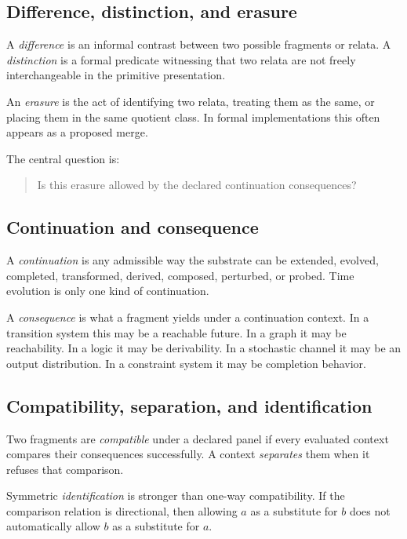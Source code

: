 \documentclass[11pt]{article}
\begin{document}
\subsection{Difference, distinction, and erasure}

A \emph{difference} is an informal contrast between two possible fragments or
relata. A \emph{distinction} is a formal predicate witnessing that two relata
are not freely interchangeable in the primitive presentation.

An \emph{erasure} is the act of identifying two relata, treating them as the
same, or placing them in the same quotient class. In formal implementations
this often appears as a proposed merge.

The central question is:

\begin{quote}
Is this erasure allowed by the declared continuation consequences?
\end{quote}

\subsection{Continuation and consequence}

A \emph{continuation} is any admissible way the substrate can be extended,
evolved, completed, transformed, derived, composed, perturbed, or probed. Time
evolution is only one kind of continuation.

A \emph{consequence} is what a fragment yields under a continuation context. In
a transition system this may be a reachable future. In a graph it may be
reachability. In a logic it may be derivability. In a stochastic channel it may
be an output distribution. In a constraint system it may be completion
behavior.

\subsection{Compatibility, separation, and identification}

Two fragments are \emph{compatible} under a declared panel if every evaluated
context compares their consequences successfully. A context \emph{separates}
them when it refuses that comparison.

Symmetric \emph{identification} is stronger than one-way compatibility. If the
comparison relation is directional, then allowing \(a\) as a substitute for
\(b\) does not automatically allow \(b\) as a substitute for \(a\).
\end{document}
